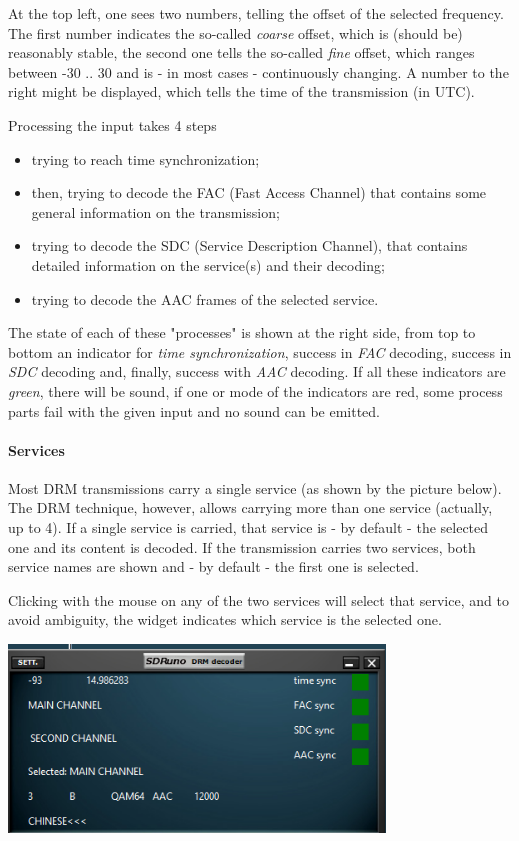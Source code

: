 \documentclass[10pt]{article}
\begin{document}
At the top left, one sees two numbers, telling the offset of the selected
frequency. The first number indicates the so-called {\em coarse} offset,
which is (should be) reasonably stable, the second one tells the
so-called {\em fine} offset, which ranges between -30 .. 30 and is
- in most cases - continuously changing. A number to the right
might be displayed, which tells the time of the transmission (in UTC).
\par
Processing the input takes 4 steps
\begin{itemize}
\item trying to reach time synchronization;
\item then, trying to decode the FAC (Fast Access Channel) that contains
some general information on the transmission;
\item trying to decode the SDC (Service Description Channel), that contains
detailed information on the service(s) and their decoding;
\item trying to decode the AAC frames of the selected service.
\end{itemize}
The state of each of these "processes" is shown at the right side,
from top to bottom an indicator for {\em time synchronization}, success
in {\em FAC} decoding, success in {\em SDC} decoding and, finally, success
with {\em AAC} decoding. 
If all these indicators are {\em green}, there will be sound, if one or
mode of the indicators are red, some process parts fail with the given input
and no sound can be emitted.
\paragraph{Services}

Most DRM transmissions carry a single service (as shown by the picture
below).
The DRM technique, however, allows carrying more than one service (actually, up to 4). If a single service is carried, that service is - by default -
the selected one and its content is decoded.
If the transmission carries two services, both service names are shown
and - by default -  the first one is selected.
\par
Clicking with the mouse on any of the two services will select that service,
and to avoid ambiguity, the widget indicates which service is the selected one.

\includegraphics[width=100mm]{drm-two-services.png}
\end{document}
